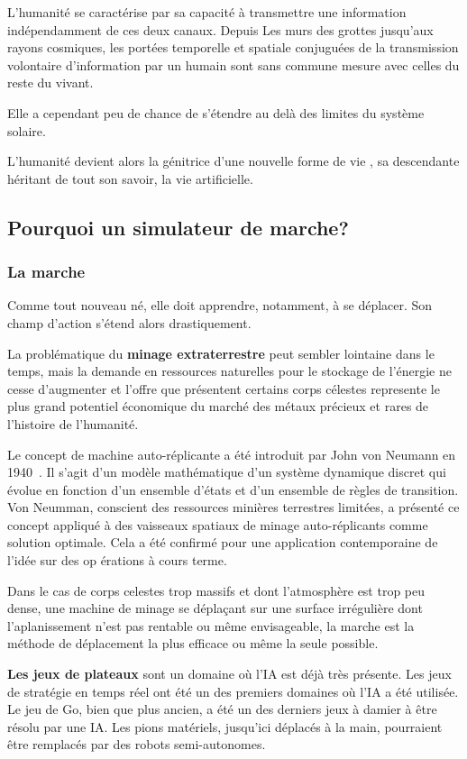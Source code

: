 \documentclass[journal, a4paper]{IEEEtran}
\begin{document}
	L'humanité se caractérise par sa capacité à transmettre une
	information indépendamment de ces deux canaux. Depuis Les murs
	des grottes jusqu'aux rayons cosmiques, les portées temporelle et
	spatiale conjuguées de	la
	transmission volontaire d'information par un humain
	sont
	sans commune mesure avec
	celles du reste du vivant.

	Elle a cependant peu de chance de s'étendre au delà des limites du
	système solaire.

	L'humanité devient alors la génitrice d'une nouvelle forme de vie
	, sa
	descendante héritant de tout son savoir,
	la vie artificielle.

	\subsection{Pourquoi un simulateur de marche?}
	\subsubsection{La marche}
	Comme tout nouveau né, elle doit apprendre, notamment, à se
	déplacer. Son champ d'action s'étend alors drastiquement.

	La problématique du \textbf{minage extraterrestre} peut sembler
	lointaine dans le temps,
	mais
	la demande en
	ressources naturelles pour le stockage de l'énergie ne cesse
	d'augmenter	et l'offre que présentent
	certains corps célestes represente le plus grand potentiel économique
	du marché des métaux précieux et rares de l'histoire de l'humanité.

	Le concept de machine auto-réplicante a été introduit par John
	von Neumann en 1940~\cite{replicating-automata}.
	Il s'agit d'un modèle
	mathématique d'un système dynamique discret qui évolue en fonction
	d'un ensemble d'états et d'un ensemble de règles de transition.
	Von Neumman, conscient des ressources minières terrestres limitées,
	a présenté ce concept appliqué à des vaisseaux
	spatiaux de minage auto-réplicants comme solution optimale. Cela a
	été confirmé pour une application contemporaine de l'idée sur des op
	érations à
	cours terme\cite{near-term_self-replicating}.

	Dans le cas de corps
	celestes trop massifs et dont l'atmosphère est trop peu dense,
	une machine
	de minage se déplaçant sur une surface irrégulière dont l'aplanissement
	n'est pas rentable ou même envisageable, la marche est
	la méthode de déplacement la plus efficace ou même la seule
	possible.

	\textbf{Les jeux de plateaux} sont un domaine où l'IA est
	déjà très présente. Les jeux de stratégie en temps réel
	ont été un des premiers domaines où l'IA a été utilisée.
	Le jeu de Go, bien que plus ancien, a été un des derniers
	jeux à damier à être résolu par une IA.
	Les pions matériels, jusqu'ici déplacés à la main,
	pourraient être remplacés par des robots semi-autonomes.
\end{document}
